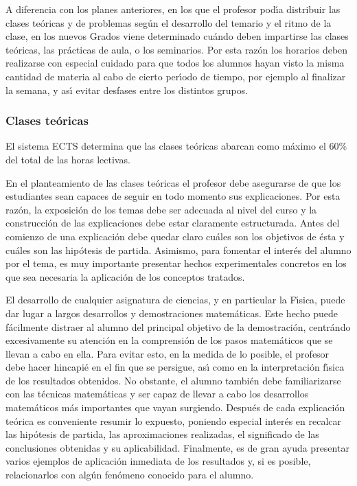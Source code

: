 A diferencia con los planes anteriores, en los que el profesor
pod\'{\i}a distribuir las clases te\'{o}ricas y de problemas
seg\'{u}n el desarrollo del temario
y el ritmo de la clase, en los nuevos Grados viene determinado
{   cu\'{a}ndo} deben impartirse las clases te\'{o}ricas,
las pr\'{a}cticas de aula, o los seminarios.
Por esta raz\'{o}n los horarios deben realizarse con especial
cuidado para que todos los alumnos hayan visto la misma cantidad de
materia al cabo de cierto per\'{\i}odo de
 tiempo, por ejemplo al finalizar la semana,  y as\'{\i} evitar desfases
entre los distintos grupos.

\subsubsection{Clases te\'{o}ricas}

El sistema ECTS determina que las
 clases te\'{o}ricas abarcan como m\'{a}ximo el 60\%  del total
de las horas lectivas.

En el planteamiento de las clases te\'{o}ricas el profesor debe 
asegurarse de que los estudiantes sean capaces de seguir en todo momento 
sus explicaciones. Por esta raz\'{o}n, la exposici\'{o}n de los temas 
debe ser adecuada al nivel del curso y la construcci\'{o}n de las 
explicaciones debe estar claramente estructurada. 
Antes del comienzo de una explicaci\'{o}n debe quedar claro cu\'{a}les
 son {  los objetivos} de \'{e}sta y cu\'{a}les son las hip\'{o}tesis de partida. 
Asimismo, para fomentar el inter\'{e}s del alumno por el tema, 
 es muy importante presentar hechos experimentales
 concretos en los que  sea necesaria la
 aplicaci\'{o}n de los conceptos tratados. 

El desarrollo de cualquier asignatura de ciencias, y en particular  
la F\'{\i}sica, puede dar lugar a largos desarrollos y demostraciones 
matem\'{a}ticas. Este hecho puede f\'{a}cilmente distraer al alumno del 
principal objetivo de la demostraci\'{o}n, centr\'{a}ndo excesivamente 
su atenci\'{o}n en la comprensi\'{o}n de los pasos matem\'{a}ticos 
que se llevan a cabo en ella. Para evitar esto, en la medida de lo posible, 
el profesor debe hacer hincapi\'{e} en {  el fin que se persigue},
 as\'{\i} como en la interpretaci\'{o}n f\'{\i}sica de los resultados obtenidos.
 No obstante, el alumno tambi\'{e}n debe familiarizarse con las
 t\'{e}cnicas matem\'{a}ticas y ser capaz de llevar a cabo los desarrollos 
matem\'{a}ticos
m\'{a}s importantes que vayan surgiendo. Despu\'{e}s de cada explicaci\'{o}n
 te\'{o}rica es conveniente { resumir} lo expuesto, poniendo especial inter\'{e}s
 en recalcar las hip\'{o}tesis de partida, las aproximaciones realizadas,
 el significado de las conclusiones obtenidas y su aplicabilidad. 
Finalmente, es de gran ayuda presentar varios {  ejemplos} de aplicaci\'{o}n
 inmediata de los resultados y, si es posible, relacionarlos con alg\'{u}n
 fen\'{o}meno conocido para el alumno.

